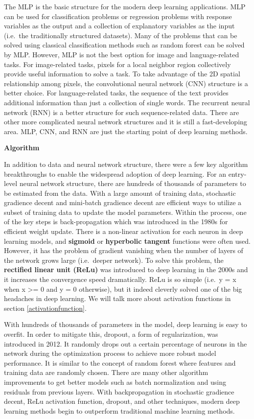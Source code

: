 \documentclass[
  12pt,
]{krantz}
\begin{document}
The MLP is the basic structure for the modern deep learning applications. MLP can be used for classification problems or regression problems with response variables as the output and a collection of explanatory variables as the input (i.e.~the traditionally structured datasets). Many of the problems that can be solved using classical classification methods such as random forest can be solved by MLP. However, MLP is not the best option for image and language-related tasks. For image-related tasks, pixels for a local neighbor region collectively provide useful information to solve a task. To take advantage of the 2D spatial relationship among pixels, the convolutional neural network (CNN) structure is a better choice. For language-related tasks, the sequence of the text provides additional information than just a collection of single words. The recurrent neural network (RNN) is a better structure for such sequence-related data. There are other more complicated neural network structures and it is still a fast-developing area. MLP, CNN, and RNN are just the starting point of deep learning methods.

\textbf{Algorithm}

In addition to data and neural network structure, there were a few key algorithm breakthroughs to enable the widespread adoption of deep learning. For an entry-level neural network structure, there are hundreds of thousands of parameters to be estimated from the data. With a large amount of training data, stochastic gradience decent and mini-batch gradience decent are efficient ways to utilize a subset of training data to update the model parameters. Within the process, one of the key steps is back-propagation which was introduced in the 1980s for efficient weight update. There is a non-linear activation for each neuron in deep learning models, and \textbf{sigmoid} or \textbf{hyperbolic tangent} functions were often used. However, it has the problem of gradient vanishing when the number of layers of the network grows large (i.e.~deeper network). To solve this problem, the \textbf{rectified linear unit (ReLu)} was introduced to deep learning in the 2000s and it increases the convergence speed dramatically. ReLu is so simple (i.e.~y = x when x \textgreater= 0 and y = 0 otherwise), but it indeed cleverly solved one of the big headaches in deep learning. We will talk more about activation functions in section \ref{activationfunction}.

With hundreds of thousands of parameters in the model, deep learning is easy to overfit. In order to mitigate this, dropout, a form of regularization, was introduced in 2012. It randomly drops out a certain percentage of neurons in the network during the optimization process to achieve more robust model performance. It is similar to the concept of random forest where features and training data are randomly chosen. There are many other algorithm improvements to get better models such as batch normalization and using residuals from previous layers. With backpropagation in stochastic gradience decent, ReLu activation function, dropout, and other techniques, modern deep learning methods begin to outperform traditional machine learning methods.
\end{document}
